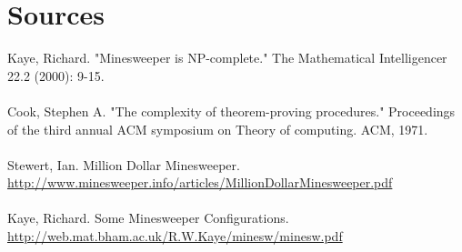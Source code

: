 \documentclass{article}
\begin{document}

\section{Sources}

Kaye, Richard. "Minesweeper is NP-complete." The Mathematical Intelligencer 22.2 (2000): 9-15. \\
\\
Cook, Stephen A. "The complexity of theorem-proving procedures." Proceedings of the third annual ACM symposium on Theory of computing. ACM, 1971. \\
\\
Stewert, Ian. Million Dollar Minesweeper. \\
\url{http://www.minesweeper.info/articles/MillionDollarMinesweeper.pdf} \\
\\
Kaye, Richard. Some Minesweeper Configurations. \\
\url{http://web.mat.bham.ac.uk/R.W.Kaye/minesw/minesw.pdf} \\

\end{document}
